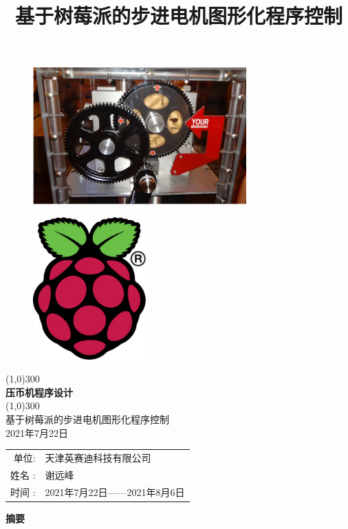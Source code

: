 \documentclass[UTF8,14pt]{article}
\title{基于树莓派的步进电机图形化程序控制}
\newcommand\sectionone[1]{\centerline{\Large{\bfseries{#1}}}}
\begin{document}
\begin{titlepage}
	\begin{center}
		\begin{figure}
			\centering
			\includegraphics[width=8.2cm]{figures/压币机.pdf}
		\end{figure}
		\vspace{0.2cm}
		\begin{figure}
			\centering
			\includegraphics[width=4.35cm]{figures/RPi-Logo-Reg-SCREEN.pdf}
		\end{figure}
		\vspace*{0.7cm}
		\line(1,0){300}\\
		[-0.2cm]
		\Huge{\bfseries 压币机程序设计}\\
		\vspace*{-0.7cm}
		\line(1,0){300}\\
		\LARGE {基于树莓派的步进电机图形化程序控制\\
			2021年7月22日}\\
		[0.6cm]
		\Large{
			\begin{tabular}{rl}
				单位:         & 天津英赛迪科技有限公司      \\
				姓名        : & 谢远峰                      \\
				时间       :  & 2021年7月22日——2021年8月6日
			\end{tabular}
		}
	\end{center}

\end{titlepage}
\clearpage
\sectionone{摘要}
\end{document}
